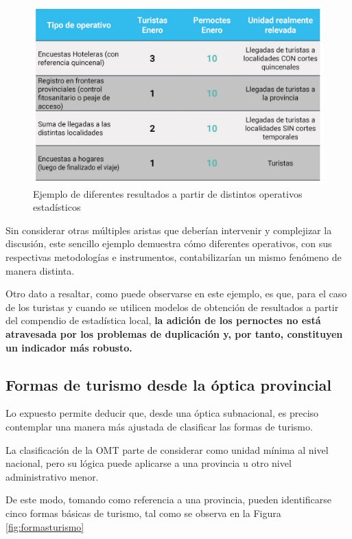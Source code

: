 \documentclass[
  openany]{book}
\begin{document}
\begin{figure}

{\centering \includegraphics[width=0.8\linewidth]{imagenes/figura1.5} 

}

\caption{Ejemplo de diferentes resultados a partir de distintos operativos estadísticos}\label{fig:operativos}
\end{figure}

Sin considerar otras múltiples aristas que deberían intervenir y complejizar la discusión, este sencillo ejemplo demuestra cómo diferentes operativos, con sus respectivas metodologías e instrumentos, contabilizarían un mismo fenómeno de manera distinta.

Otro dato a resaltar, como puede observarse en este ejemplo, es que, para el caso de los turistas y cuando se utilicen modelos de obtención de resultados a partir del compendio de estadística local, \textbf{la adición de los pernoctes no está atravesada por los problemas de duplicación y, por tanto, constituyen un indicador más robusto.}

\hypertarget{formas-de-turismo-desde-la-uxf3ptica-provincial}{%
\subsection{Formas de turismo desde la óptica provincial}\label{formas-de-turismo-desde-la-uxf3ptica-provincial}}

Lo expuesto permite deducir que, desde una óptica subnacional, es preciso contemplar una manera más ajustada de clasificar las formas de turismo.

La clasificación de la OMT parte de considerar como unidad mínima al nivel nacional, pero su lógica puede aplicarse a una provincia u otro nivel administrativo menor.

De este modo, tomando como referencia a una provincia, pueden identificarse cinco formas básicas de turismo, tal como se observa en la Figura \ref{fig:formasturismo}
\end{document}
